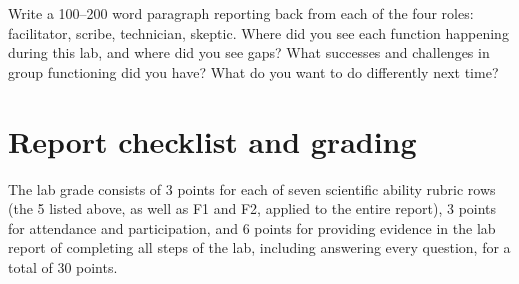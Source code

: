 \begin{steps}
	\item Write a 100--200 word paragraph reporting back from each of the four roles: facilitator, scribe, technician, skeptic. Where did you see each function happening during this lab, and where did you see gaps? What successes and challenges in group functioning did you have? What do you want to do differently next time?
\end{steps}

\section{Report checklist and grading}

The lab grade consists of 3 points for each of seven scientific ability rubric rows (the 5 listed above, as well as F1 and F2, applied to the entire report), 3 points for attendance and participation, and 6 points for providing evidence in the lab report of completing all steps of the lab, including answering every question, for a total of 30 points.